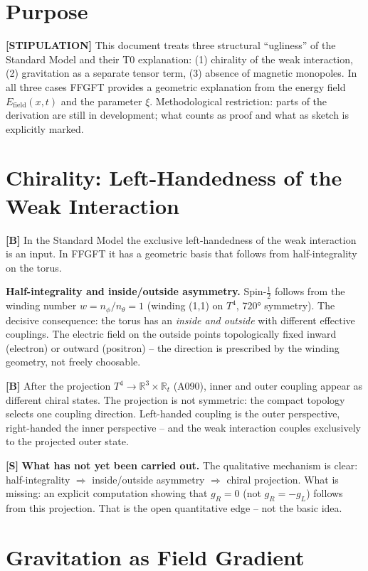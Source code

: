 \section{Purpose}

\textbf{[STIPULATION]} This document treats three structural ``ugliness'' of the
Standard Model and their T0 explanation: (1) chirality of the weak interaction,
(2) gravitation as a separate tensor term, (3) absence of magnetic monopoles.
In all three cases FFGFT provides a geometric explanation from the energy field
$E_\text{field}(x,t)$ and the parameter $\xi$. Methodological restriction: parts
of the derivation are still in development; what counts as proof and what as sketch
is explicitly marked.

\section{Chirality: Left-Handedness of the Weak Interaction}

\textbf{[B]} In the Standard Model the exclusive left-handedness of the weak
interaction is an input. In FFGFT it has a geometric basis that follows from
half-integrality on the torus.

\textbf{Half-integrality and inside/outside asymmetry.} Spin-$\tfrac12$ follows
from the winding number $w=n_\phi/n_\theta=1$ (winding (1,1) on $T^4$,
720° symmetry). The decisive consequence: the torus has an \emph{inside and
outside} with different effective couplings. The electric field on the outside
points topologically fixed inward (electron) or outward (positron) -- the direction
is prescribed by the winding geometry, not freely choosable.

\textbf{[B]} After the projection $T^4\to\mathbb{R}^3\times\mathbb{R}_t$ (A090),
inner and outer coupling appear as different chiral states. The projection is not
symmetric: the compact topology selects one coupling direction. Left-handed coupling
is the outer perspective, right-handed the inner perspective -- and the weak
interaction couples exclusively to the projected outer state.

\textbf{[S]} \textbf{What has not yet been carried out.} The qualitative mechanism
is clear: half-integrality $\Rightarrow$ inside/outside asymmetry $\Rightarrow$
chiral projection. What is missing: an explicit computation showing that $g_R=0$
(not $g_R=-g_L$) follows from this projection. That is the open quantitative
edge -- not the basic idea.

\section{Gravitation as Field Gradient}

